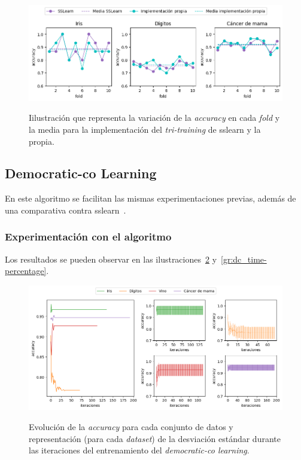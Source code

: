 \begin{figure}[h]
	\caption[\textit{Tri-training}: comparativa contra sslearn]{Iilustración que representa la variación de la \textit{accuracy} en cada \textit{fold} y la media para la implementación del \textit{tri-training} de sslearn y la propia.}
	\centering
	\includegraphics[width=\textwidth]{../img/memoria/5_tritraining_sslearn}
	\label{gr:tt_vs_sslearn}
\end{figure}


\subsection{Democratic-co Learning}
\label{democraticco-exp}

En este algoritmo se facilitan las mismas experimentaciones previas, además de una comparativa contra sslearn~\cite{sslearnRepo}.

\subsubsection{Experimentación con el algoritmo}
Los resultados se pueden observar en las ilustraciones~\ref{gr:dc_train-iterations} y~\ref{gr:dc_time-percentage}.

\begin{figure}[h]
	\caption[\textit{Democratic-co}: resultados (iteraciones-entrenamiento)]{Evolución de la \textit{accuracy} para cada conjunto de datos y representación (para cada \textit{dataset}) de la desviación estándar durante las iteraciones del entrenamiento del \textit{democratic-co learning}.}
	\centering
	\includegraphics[width=\textwidth]{../img/memoria/5_democraticco_score-iteraciones}
	\label{gr:dc_train-iterations}
\end{figure}

